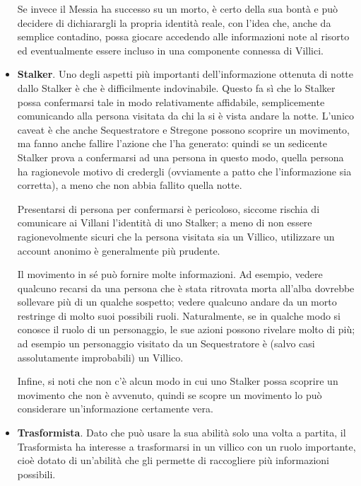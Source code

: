 \documentclass[a4paper,10pt]{article}
\begin{document}
\begin{itemize}
	Se invece il Messia ha successo su un morto, è certo della sua bontà e può decidere di dichiarargli la propria identità reale, con l’idea che, anche da semplice contadino, possa giocare accedendo alle informazioni note al risorto ed eventualmente essere incluso in una componente connessa di Villici.
	
	\item {\bf Stalker}. Uno degli aspetti più importanti dell'informazione ottenuta di notte dallo Stalker è che è difficilmente indovinabile. Questo fa sì che lo Stalker possa confermarsi tale in modo relativamente affidabile, semplicemente comunicando alla persona visitata da chi la si è vista andare la notte. L'unico caveat è che anche Sequestratore e Stregone possono scoprire un movimento, ma fanno anche fallire l'azione che l'ha generato: quindi se un sedicente Stalker prova a confermarsi ad una persona in questo modo, quella persona ha ragionevole motivo di credergli (ovviamente a patto che l'informazione sia corretta), a meno che non abbia fallito quella notte.

    Presentarsi di persona per confermarsi è pericoloso, siccome rischia di comunicare ai Villani l'identità di uno Stalker; a meno di non essere ragionevolmente sicuri che la persona visitata sia un Villico, utilizzare un account anonimo è generalmente più prudente.

    Il movimento in sé può fornire molte informazioni. Ad esempio, vedere qualcuno recarsi da una persona che è stata ritrovata morta all'alba dovrebbe sollevare più di un qualche sospetto; vedere qualcuno andare da un morto restringe di molto suoi possibili ruoli. Naturalmente, se in qualche modo si conosce il ruolo di un personaggio, le sue azioni possono rivelare molto di più; ad esempio un personaggio visitato da un Sequestratore è (salvo casi assolutamente improbabili) un Villico.

    Infine, si noti che non c'è alcun modo in cui uno Stalker possa scoprire un movimento che non è avvenuto, quindi se scopre un movimento lo può considerare un'informazione certamente vera. %

	\item {\bf Trasformista}. Dato che può usare la sua abilità solo una volta a partita, il Trasformista ha interesse a trasformarsi in un villico con un ruolo importante, cioè dotato di un’abilità che gli permette di raccogliere più informazioni possibili.
    

\end{itemize}
\end{document}
